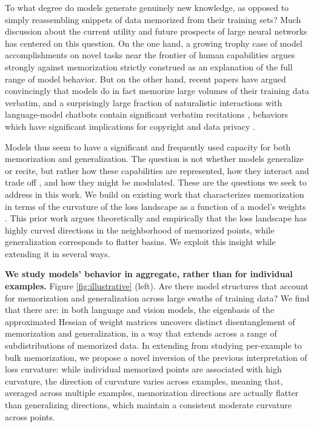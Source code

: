 \documentclass{article} %
\begin{document}
To what degree do models generate genuinely new knowledge, as opposed to simply reassembling snippets of data memorized from their training sets? Much discussion about the current utility and future prospects of large neural networks has centered on this question. On the one hand, a growing trophy case of model accomplishments on novel tasks near the frontier of human capabilities argues strongly against memorization strictly construed as an explanation of the full range of model behavior. But on the other hand, recent papers have argued convincingly that models do in fact memorize large volumes of their training data verbatim, and a surprisingly large fraction of naturalistic interactions with language-model chatbots contain significant verbatim recitations \citep{aerni2024measuringnonadversarialreproductiontraining, carlini2022quantifying, stoehr2024localizing}, behaviors which have significant implications for copyright and data privacy \citep{karamolegkou2023copyright, carlini2019secret, shokri2017membership}. 

Models thus seem to have a significant and frequently used capacity for both memorization and generalization. The question is not whether models generalize or recite, but rather how these capabilities are represented, how they interact and trade off \citep{nguyen2025differential}, and how they might be modulated. These are the questions we seek to address in this work. We build on existing work that characterizes memorization in terms of the curvature of the loss landscape as a function of a model's weights \citep{foretsharpness, hochreiter1997flat, lecun1989optimal, hassibi1993optimal, keskar2017large, garg2024memorization, ravikumar2024unveiling, jeon2024understanding, kim2023memorization}. This prior work argues theoretically and empirically that the loss landscape has highly curved directions in the neighborhood of memorized points, while generalization corresponds to flatter basins. We exploit this insight while extending it in several ways.

\textbf{We study models’ behavior in aggregate, rather than for individual examples.} Figure \ref{fig:illustrative} (left). Are there model structures that account for memorization and generalization across large swaths of training data? We find that there are: in both language and vision models, the eigenbasis of the approximated Hessian of weight matrices uncovers distinct disentanglement of memorization and generalization, in a way that extends across a range of subdistributions of memorized data. In extending from studying per-example to bulk memorization, we propose a novel inversion of the previous interpretation of loss curvature: while individual memorized points are associated with high curvature, the direction of curvature varies across examples, meaning that, averaged across multiple examples, memorization directions are actually flatter than generalizing directions, which maintain a consistent moderate curvature across points. 
\end{document}
